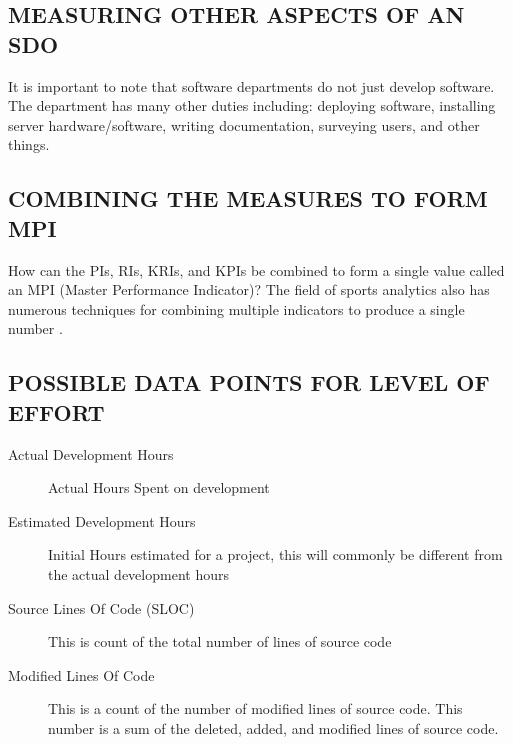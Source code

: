 \documentclass[SDSUThesis.tex]{subfiles}
\begin{document}
\subsection{MEASURING OTHER ASPECTS OF AN SDO}

It is important to note that software departments do not just
develop software.  The department has many other duties
including: deploying software, installing server hardware/software,
writing documentation, surveying users, and other things.

\subsection{COMBINING THE MEASURES TO FORM MPI}

How can the PIs, RIs, KRIs, and KPIs be combined to form a single
value called an MPI (Master Performance Indicator)?  The field
of sports analytics also has numerous techniques for combining
multiple indicators to produce a single number \cite{Cervone2014}.


\subsection{POSSIBLE DATA POINTS FOR LEVEL OF EFFORT}

\begin{description}
    \item[Actual Development Hours] Actual Hours Spent on development
    \item[Estimated Development Hours]  Initial Hours estimated for a project, this will commonly be different from the actual development hours
    \item[Source Lines Of Code (SLOC)]  This is count of the total number of lines of source code
    \item[Modified Lines Of Code] This is a count of the number of modified lines of source code. This number is a sum of the deleted, added, and modified lines of source code.
\end{description}
\end{document}
